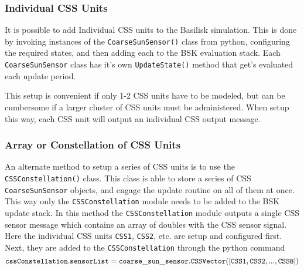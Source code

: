 \subsubsection{Individual CSS Units}
It is possible to add Individual CSS units to the Basilisk simulation.   This is done by invoking instances of the {\tt CoarseSunSensor()} class from python, configuring the required states, and then adding each to the BSK evaluation stack.  Each {\tt CoarseSunSensor} class has it's own {\tt UpdateState()} method that get's evaluated each update period.  

This setup is convenient if only 1-2 CSS units have to be modeled, but can be cumbersome if a larger cluster of CSS units must be administered.  When setup this way, each CSS unit will output an individual CSS output message.

\subsubsection{Array or Constellation of CSS Units}
An alternate method to setup a series of CSS units is to use the {\tt CSSConstellation()} class.  This class is able to store a series of CSS {\tt CoarseSunSensor} objects, and engage the update routine on all of them at once.  This way only the {\tt CSSConstellation} module needs to be added to the BSK update stack.  In this method the 
{\tt CSSConstellation} module outputs a single CSS sensor message which contains an array of doubles with the CSS sensor signal.  Here the individual CSS units {\tt CSS1}, {\tt CSS2}, etc. are setup and configured first.  Next, they are added to the {\tt CSSConstellation} through the python command
$$
	{\tt cssConstellation.sensorList = coarse\_sun\_sensor.CSSVector([CSS1, CSS2, ..., CSS8])}
$$

